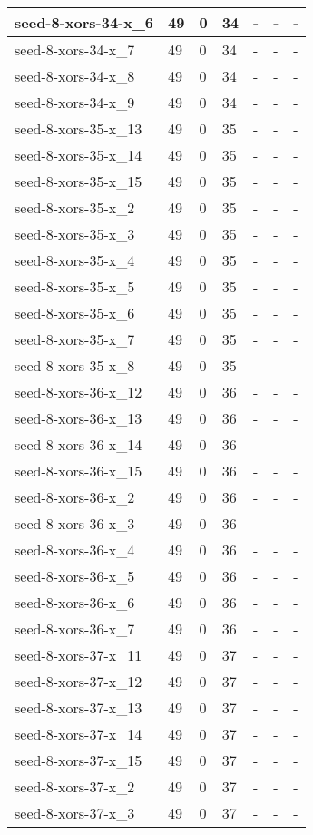 \begin{scriptsize}
\begin{longtable}{|p{5cm}|l|l|l|l|l|l|}
seed-8-xors-34-x\_6&49&0&34&-&-&- \\ \hline 
seed-8-xors-34-x\_7&49&0&34&-&-&- \\ \hline 
seed-8-xors-34-x\_8&49&0&34&-&-&- \\ \hline 
seed-8-xors-34-x\_9&49&0&34&-&-&- \\ \hline 
seed-8-xors-35-x\_13&49&0&35&-&-&- \\ \hline 
seed-8-xors-35-x\_14&49&0&35&-&-&- \\ \hline 
seed-8-xors-35-x\_15&49&0&35&-&-&- \\ \hline 
seed-8-xors-35-x\_2&49&0&35&-&-&- \\ \hline 
seed-8-xors-35-x\_3&49&0&35&-&-&- \\ \hline 
seed-8-xors-35-x\_4&49&0&35&-&-&- \\ \hline 
seed-8-xors-35-x\_5&49&0&35&-&-&- \\ \hline 
seed-8-xors-35-x\_6&49&0&35&-&-&- \\ \hline 
seed-8-xors-35-x\_7&49&0&35&-&-&- \\ \hline 
seed-8-xors-35-x\_8&49&0&35&-&-&- \\ \hline 
seed-8-xors-36-x\_12&49&0&36&-&-&- \\ \hline 
seed-8-xors-36-x\_13&49&0&36&-&-&- \\ \hline 
seed-8-xors-36-x\_14&49&0&36&-&-&- \\ \hline 
seed-8-xors-36-x\_15&49&0&36&-&-&- \\ \hline 
seed-8-xors-36-x\_2&49&0&36&-&-&- \\ \hline 
seed-8-xors-36-x\_3&49&0&36&-&-&- \\ \hline 
seed-8-xors-36-x\_4&49&0&36&-&-&- \\ \hline 
seed-8-xors-36-x\_5&49&0&36&-&-&- \\ \hline 
seed-8-xors-36-x\_6&49&0&36&-&-&- \\ \hline 
seed-8-xors-36-x\_7&49&0&36&-&-&- \\ \hline 
seed-8-xors-37-x\_11&49&0&37&-&-&- \\ \hline 
seed-8-xors-37-x\_12&49&0&37&-&-&- \\ \hline 
seed-8-xors-37-x\_13&49&0&37&-&-&- \\ \hline 
seed-8-xors-37-x\_14&49&0&37&-&-&- \\ \hline 
seed-8-xors-37-x\_15&49&0&37&-&-&- \\ \hline 
seed-8-xors-37-x\_2&49&0&37&-&-&- \\ \hline 
seed-8-xors-37-x\_3&49&0&37&-&-&- \\ \hline 

\end{longtable}
\end{scriptsize}
